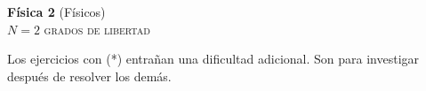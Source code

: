 \documentclass[11pt,spanish,a4paper]{article}
\begin{document}
\begin{center}
	\textbf{Física 2} (Físicos) \hfill {}\\
	\textsc{\LARGE \(N=2\) grados de libertad}
\end{center}


Los ejercicios con (*) entrañan una dificultad adicional. Son para investigar después de resolver los demás.

\begin{enumerate}



\end{enumerate}
\end{document}

